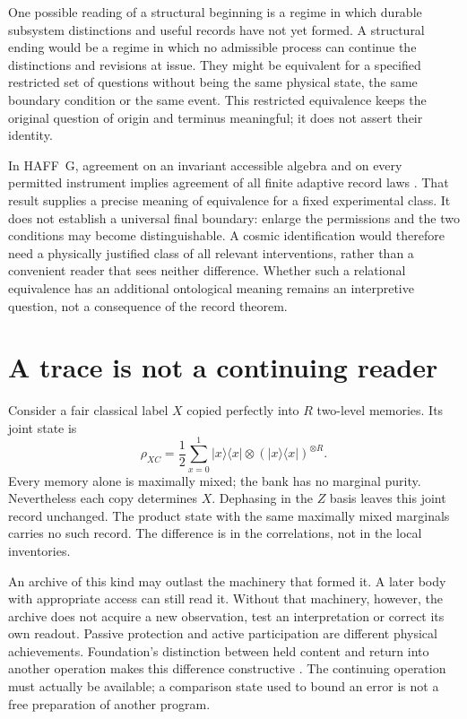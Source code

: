 \documentclass[12pt,a4paper]{article}
\begin{document}
One possible reading of a structural beginning is a regime in which
durable subsystem distinctions and useful records have not yet formed.
A structural ending would be a regime in which no admissible process
can continue the distinctions and revisions at issue. They might be
equivalent for a specified restricted set of questions without being the
same physical state, the same boundary condition or the same event.
This restricted equivalence keeps the original question of origin and
terminus meaningful; it does not assert their identity.

In HAFF~G, agreement on an invariant accessible algebra and on every
permitted instrument implies agreement of all finite adaptive record
laws \cite{G}. That result supplies a precise meaning of equivalence
for a fixed experimental class. It does not establish a universal
final boundary: enlarge the permissions and the two conditions may
become distinguishable. A cosmic identification would therefore need
a physically justified class of all relevant interventions, rather
than a convenient reader that sees neither difference.
Whether such a relational equivalence has an additional ontological
meaning remains an interpretive question, not a consequence of the
record theorem.

\section{A trace is not a continuing reader}

Consider a fair classical label $X$ copied perfectly into $R$ two-level memories. Its joint state is
\[
 \rho_{XC}=\frac12\sum_{x=0}^1
 |x\rangle\langle x|\otimes
 (|x\rangle\langle x|)^{\otimes R}.
\]
Every memory alone is maximally mixed; the bank has no marginal purity. Nevertheless each copy determines $X$. Dephasing in the $Z$ basis leaves this joint record unchanged. The product state with the same maximally mixed marginals carries no such record. The difference is in the correlations, not in the local inventories.

An archive of this kind may outlast the machinery that formed it. A later body with appropriate access can still read it. Without that machinery, however, the archive does not acquire a new observation, test an interpretation or correct its own readout. Passive protection and active participation are different physical achievements. Foundation's distinction between held content and return into another operation makes this difference constructive \cite{Foundation}. The continuing operation must actually be available; a comparison state used to bound an error is not a free preparation of another program.
\end{document}

